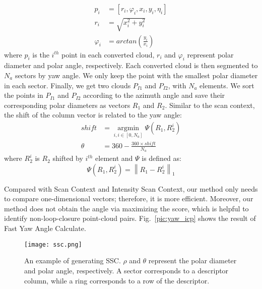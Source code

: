 \documentclass[letterpaper, 10 pt, conference]{ieeeconf}
\begin{document}
\begin{equation}
    \begin{aligned}
    p_i&=[r_i,\varphi_i  ,x_i,y_i,\eta_i ] \\
    r_i&=\sqrt{x_i^2+y_i^2} \\
    \varphi_i &=arctan(\frac{y_i}{x_i} )
    \end{aligned}
\end{equation}
where \(p_i\) is the \(i^{th}\) point in each converted cloud, \(r_i\) and \(\varphi_i\) represent polar diameter and polar angle, respectively. Each converted cloud is then segmented to \( N_a\) sectors by yaw angle. We only keep the point with the smallest polar diameter in each sector. Finally, we get two clouds \(P_{I1}\) and \(P_{I2}\), with \(N_a\) elements. We sort the points in \(P_{I1}\) and \(P_{I2}\) according to the azimuth angle and save their corresponding polar diameters as vectors \(R_1\) and \(R_2\). Similar to the scan context, the shift of the column vector is related to the yaw angle:
 \begin{equation}\label{equ:shift}
    \begin{aligned}
     shift&=\mathop{argmin}\limits_{i, i\in [0,N_a]}\varPsi (R_1,R_2^i) \\
     \theta&=360-\frac{360\times shift}{N_a} 
    \end{aligned}
 \end{equation}
where \(R_2^i\) is \(R_2\) shifted by \(i^{th}\) element and \(\varPsi\) is defined as:
\begin{equation}
    \varPsi (R_1,R_2^i)=\left\lVert R_1-R_2^i\right\rVert_1 
\end{equation}

Compared with Scan Context and Intensity Scan Context, our method only needs to compare one-dimensional vectors; therefore, it is more efficient. Moreover, our method does not obtain the angle via maximizing the score, which is helpful to identify non-loop-closure point-cloud pairs. Fig.~\ref{pic:yaw_icp} shows the result of Fast Yaw Angle Calculate.

\begin{figure}[t]
    \centering
\texttt{[image: ssc.png]}\vspace{-2mm}
\caption{An example of generating SSC. \(\rho\) and \(\theta\) represent the polar diameter and polar angle, respectively. A sector corresponds to a descriptor column, while a ring corresponds to a row of the descriptor.}
    \label{pic:ssc}
 \end{figure}
\end{document}

